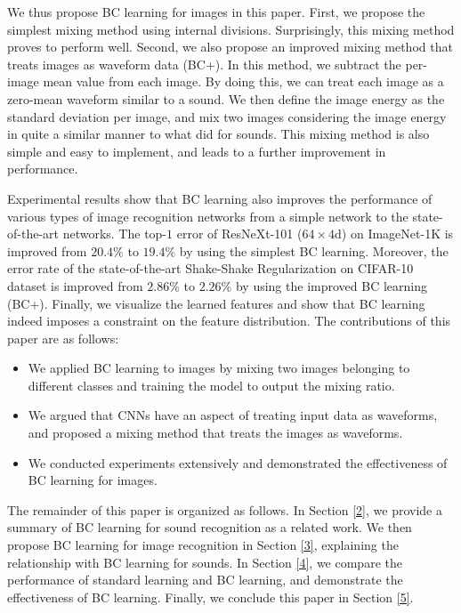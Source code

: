 \documentclass[10pt,twocolumn,letterpaper]{article}
\begin{document}
We thus propose BC learning for images in this paper. First, we propose the simplest mixing method using internal divisions. Surprisingly, this mixing method proves to perform well. Second, we also propose an improved mixing method that treats images as waveform data (BC+). In this method, we subtract the per-image mean value from each image. By doing this, we can treat each image as a zero-mean waveform similar to a sound. We then define the image energy as the standard deviation per image, and mix two images considering the image energy in quite a similar manner to what \cite{tokozume2018learning} did for sounds. This mixing method is also simple and easy to implement, and leads to a further improvement in performance.

Experimental results show that BC learning also improves the performance of various types of image recognition networks from a simple network to the state-of-the-art networks. The top-$1$ error of ResNeXt-101 ($64\times4$d) \cite{xie2017aggregated} on ImageNet-1K is improved from $20.4\%$ to $19.4\%$ by using the simplest BC learning. Moreover, the error rate of the state-of-the-art Shake-Shake Regularization \cite{gastaldi2017shake} on CIFAR-10 dataset is improved from $2.86\%$ to $2.26\%$ by using the improved BC learning (BC+). Finally, we visualize the learned features and show that BC learning indeed imposes a constraint on the feature distribution. The contributions of this paper are as follows:
\begin{itemize}
\vspace{-1mm}
\setlength{\itemsep}{0cm} 
 \item{We applied BC learning \cite{tokozume2018learning} to images by mixing two images belonging to different classes and training the model to output the mixing ratio.} 
 \item{We argued that CNNs have an aspect of treating input data as waveforms, and proposed a mixing method that treats the images as waveforms.} 
 \item{We conducted experiments extensively and demonstrated the effectiveness of BC learning for images.} 
\end{itemize}

The remainder of this paper is organized as follows. In Section \ref{2}, we provide a summary of BC learning for sound recognition \cite{tokozume2018learning} as a related work. We then propose BC learning for image recognition in Section \ref{3}, explaining the relationship with BC learning for sounds. In Section \ref{4}, we compare the performance of standard learning and BC learning, and demonstrate the effectiveness of BC learning. Finally, we conclude this paper in Section \ref{5}.
\end{document}
